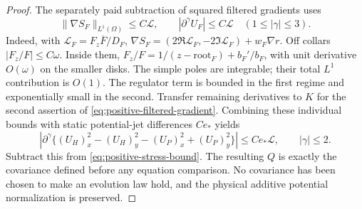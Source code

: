 \begin{proof}
The separately paid subtraction of squared filtered gradients uses
\begin{equation}
 \|\nabla S_F\|_{L^1(\Omega)}\le C\mathcal L,\qquad
 |\partial^\gamma U_F|\le C\mathcal L\quad(1\le|\gamma|\le3).
 \label{eq:positive-filtered-gradient}
\end{equation}
Indeed, with $\mathcal L_F=F_z\overline F/D_F$,
$\nabla S_F=(2\Re\mathcal L_F,-2\Im\mathcal L_F)+w_F\nabla r$.
Off collars $|F_z/F|\le C\omega$. Inside them,
$F_z/F=1/(z-\text{root}_F)+b_F'/b_F$, with unit derivative
$O(\omega)$ on the smaller disks. The simple poles are integrable;
their total $L^1$ contribution is $O(1)$.
The regulator term is bounded in the first regime and exponentially
small in the second. Transfer remaining derivatives to $K$ for the
second assertion of \eqref{eq:positive-filtered-gradient}.
Combining these individual bounds with static potential-jet
differences $Ce_*$ yields
\begin{equation}
 |\partial^\gamma\{(U_H)_x^2-(U_H)_y^2
                   -(U_P)_x^2+(U_P)_y^2\}|
 \le Ce_*\mathcal L,\qquad |\gamma|\le2.
 \label{eq:positive-filtered-square-difference}
\end{equation}
Subtract this from \eqref{eq:positive-stress-bound}.
The resulting $Q$ is exactly the covariance defined before any equation
comparison. No covariance has been chosen to make an evolution law hold,
and the physical additive potential normalization is preserved.
\end{proof}

